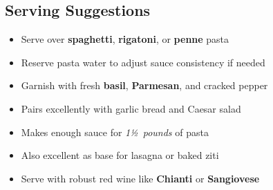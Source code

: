 \documentclass[11pt,letterpaper]{article}
\begin{document}
{\begin{multicols}{2}
\subsection*{Serving Suggestions}
\begin{itemize}
    \item Serve over \textbf{spaghetti}, \textbf{rigatoni}, or \textbf{penne} pasta
    \item Reserve pasta water to adjust sauce consistency if needed
    \item Garnish with fresh \textbf{basil}, \textbf{Parmesan}, and cracked pepper
    \item Pairs excellently with garlic bread and Caesar salad
    \item Makes enough sauce for \textit{1½~pounds} of pasta
    \item Also excellent as base for lasagna or baked ziti
    \item Serve with robust red wine like \textbf{Chianti} or \textbf{Sangiovese}
\end{itemize}

\end{multicols}
}
\end{document}
